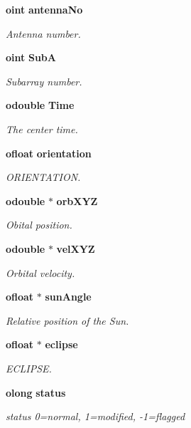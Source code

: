 \begin{CompactItemize}
{\bf oint} {\bf antenna\-No}
\begin{CompactList}\small\item\em Antenna number. \item\end{CompactList}\item 
{\bf oint} {\bf Sub\-A}
\begin{CompactList}\small\item\em Subarray number. \item\end{CompactList}\item 
{\bf odouble} {\bf Time}
\begin{CompactList}\small\item\em The center time. \item\end{CompactList}\item 
{\bf ofloat} {\bf orientation}
\begin{CompactList}\small\item\em ORIENTATION. \item\end{CompactList}\item 
{\bf odouble} $\ast$ {\bf orb\-XYZ}
\begin{CompactList}\small\item\em Obital position. \item\end{CompactList}\item 
{\bf odouble} $\ast$ {\bf vel\-XYZ}
\begin{CompactList}\small\item\em Orbital velocity. \item\end{CompactList}\item 
{\bf ofloat} $\ast$ {\bf sun\-Angle}
\begin{CompactList}\small\item\em Relative position of the Sun. \item\end{CompactList}\item 
{\bf ofloat} $\ast$ {\bf eclipse}
\begin{CompactList}\small\item\em ECLIPSE. \item\end{CompactList}\item 
{\bf olong} {\bf status}
\begin{CompactList}\small\item\em status 0=normal, 1=modified, -1=flagged \item\end{CompactList}\end{CompactItemize}


